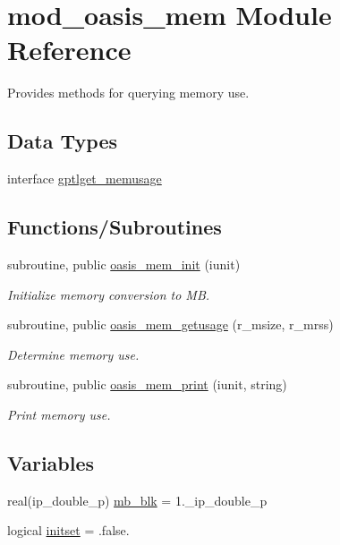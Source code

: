 \hypertarget{namespacemod__oasis__mem}{}\section{mod\+\_\+oasis\+\_\+mem Module Reference}
\label{namespacemod__oasis__mem}


Provides methods for querying memory use.  


\subsection*{Data Types}
\begin{DoxyCompactItemize}
\item 
interface \hyperlink{interfacemod__oasis__mem_1_1gptlget__memusage}{gptlget\+\_\+memusage}
\end{DoxyCompactItemize}
\subsection*{Functions/\+Subroutines}
\begin{DoxyCompactItemize}
\item 
subroutine, public \hyperlink{namespacemod__oasis__mem_a104b7e7e85cd79e731a6e12a14358bbb}{oasis\+\_\+mem\+\_\+init} (iunit)
\begin{DoxyCompactList}\small\item\em Initialize memory conversion to MB. \end{DoxyCompactList}\item 
subroutine, public \hyperlink{namespacemod__oasis__mem_a2e20a40b48c7a7572f72da1b5d109ce3}{oasis\+\_\+mem\+\_\+getusage} (r\+\_\+msize, r\+\_\+mrss)
\begin{DoxyCompactList}\small\item\em Determine memory use. \end{DoxyCompactList}\item 
subroutine, public \hyperlink{namespacemod__oasis__mem_ac628b504553edbe9345cd070a8db2634}{oasis\+\_\+mem\+\_\+print} (iunit, string)
\begin{DoxyCompactList}\small\item\em Print memory use. \end{DoxyCompactList}\end{DoxyCompactItemize}
\subsection*{Variables}
\begin{DoxyCompactItemize}
\item 
real(ip\+\_\+double\+\_\+p) \hyperlink{namespacemod__oasis__mem_a7c262f1c120ed57d527ee3de91552ee9}{mb\+\_\+blk} = 1.\+\_\+ip\+\_\+double\+\_\+p
\item 
logical \hyperlink{namespacemod__oasis__mem_aad83c95e1a17a31825eb9c4e1c663aa1}{initset} = .false.
\end{DoxyCompactItemize}


